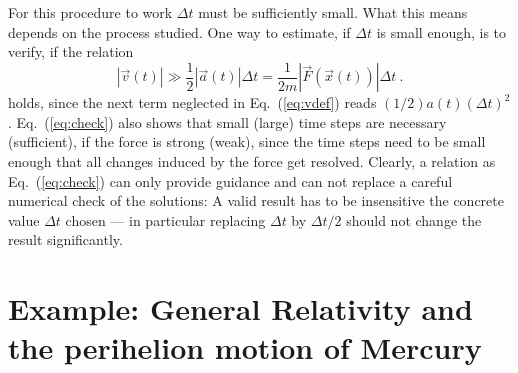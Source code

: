 \documentclass[12pt]{iopart}
\begin{document}
For this procedure to work $\Delta t$ must be sufficiently small. What this means depends on the process
studied. One way to estimate, if $\Delta t$ is small enough, is to verify, if the relation
\begin{equation}
|\vec v(t)| \gg \frac12|\vec a(t)|\Delta t = \frac{1}{2m} |\vec F(\vec x(t)) |\Delta t\ . 
\label{eq:check}
\end{equation}
holds, since the next term neglected in Eq.~(\ref{eq:vdef}) reads $(1/2)a(t)(\Delta t)^2$.  Eq.~({\ref{eq:check}})
also shows that small (large) time steps are necessary (sufficient), if the force is strong (weak), since
the time steps need to be small enough that all changes induced by the force get resolved. Clearly,
a relation as Eq.~({\ref{eq:check}}) can only provide guidance and can not replace a careful numerical check of
the solutions: A valid result has to be insensitive the concrete value $\Delta t$ chosen --- in particular replacing
$\Delta t$ by $\Delta t/2$ should not change the result significantly.



\section{Example: General Relativity and the perihelion motion of Mercury}\label{sec:gr}
\end{document}
